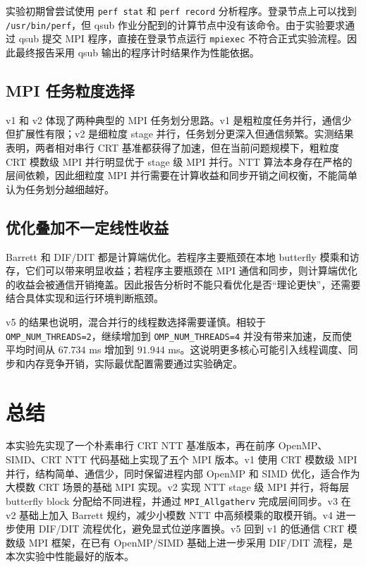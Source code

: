 \documentclass[a4paper]{article}
\begin{document}
实验初期曾尝试使用 \texttt{perf stat} 和 \texttt{perf record} 分析程序。登录节点上可以找到 \texttt{/usr/bin/perf}，但 qsub 作业分配到的计算节点中没有该命令。由于实验要求通过 qsub 提交 MPI 程序，直接在登录节点运行 \texttt{mpiexec} 不符合正式实验流程。因此最终报告采用 qsub 输出的程序计时结果作为性能依据。

\subsection{MPI 任务粒度选择}

v1 和 v2 体现了两种典型的 MPI 任务划分思路。v1 是粗粒度任务并行，通信少但扩展性有限；v2 是细粒度 stage 并行，任务划分更深入但通信频繁。实测结果表明，两者相对串行 CRT 基准都获得了加速，但在当前问题规模下，粗粒度 CRT 模数级 MPI 并行明显优于 stage 级 MPI 并行。NTT 算法本身存在严格的层间依赖，因此细粒度 MPI 并行需要在计算收益和同步开销之间权衡，不能简单认为任务划分越细越好。

\subsection{优化叠加不一定线性收益}

Barrett 和 DIF/DIT 都是计算端优化。若程序主要瓶颈在本地 butterfly 模乘和访存，它们可以带来明显收益；若程序主要瓶颈在 MPI 通信和同步，则计算端优化的收益会被通信开销掩盖。因此报告分析时不能只看优化是否“理论更快”，还需要结合具体实现和运行环境判断瓶颈。

v5 的结果也说明，混合并行的线程数选择需要谨慎。相较于 \texttt{OMP\_NUM\_THREADS=2}，继续增加到 \texttt{OMP\_NUM\_THREADS=4} 并没有带来加速，反而使平均时间从 $67.734$ ms 增加到 $91.944$ ms。这说明更多核心可能引入线程调度、同步和内存竞争开销，实际最优配置需要通过实验确定。

\section{总结}

本实验先实现了一个朴素串行 CRT NTT 基准版本，再在前序 OpenMP、SIMD、CRT NTT 代码基础上实现了五个 MPI 版本。v1 使用 CRT 模数级 MPI 并行，结构简单、通信少，同时保留进程内部 OpenMP 和 SIMD 优化，适合作为大模数 CRT 场景的基础 MPI 实现。v2 实现 NTT stage 级 MPI 并行，将每层 butterfly block 分配给不同进程，并通过 \texttt{MPI\_Allgatherv} 完成层间同步。v3 在 v2 基础上加入 Barrett 规约，减少小模数 NTT 中高频模乘的取模开销。v4 进一步使用 DIF/DIT 流程优化，避免显式位逆序置换。v5 回到 v1 的低通信 CRT 模数级 MPI 框架，在已有 OpenMP/SIMD 基础上进一步采用 DIF/DIT 流程，是本次实验中性能最好的版本。
\end{document}
